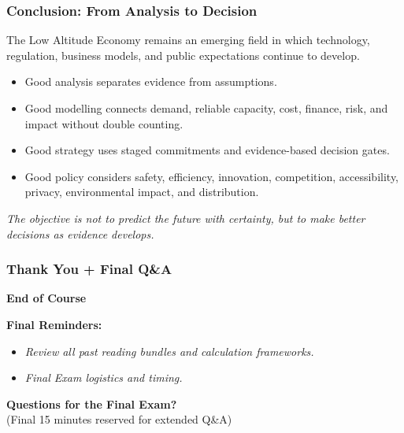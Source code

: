 \documentclass{beamer}
\begin{document}
\begin{frame}[t]
\frametitle{Conclusion: From Analysis to Decision}
The Low Altitude Economy remains an emerging field in which technology, regulation, business models, and public expectations continue to develop.
\begin{itemize}
\item Good analysis separates evidence from assumptions.
\item Good modelling connects demand, reliable capacity, cost, finance, risk, and impact without double counting.
\item Good strategy uses staged commitments and evidence-based decision gates.
\item Good policy considers safety, efficiency, innovation, competition, accessibility, privacy, environmental impact, and distribution.
\end{itemize}
\vspace{0.3cm}
\begin{center}
\textit{The objective is not to predict the future with certainty, but to make better decisions as evidence develops.}
\end{center}
\end{frame}

\begin{frame}[t]
  \frametitle{Thank You + Final Q\&A}
  
  \begin{center}
      \Large \textbf{End of Course}
  \end{center}
  
  \vspace{1cm}
  \textbf{Final Reminders:}
  \begin{itemize}
      \item \textit{Review all past reading bundles and calculation frameworks.}
      \item \textit{Final Exam logistics and timing.}
  \end{itemize}
  
  \vspace{0.5cm}
  \begin{center}
      \textbf{Questions for the Final Exam?} \\
      \small (Final 15 minutes reserved for extended Q\&A)
  \end{center}
\end{frame}
\end{document}
